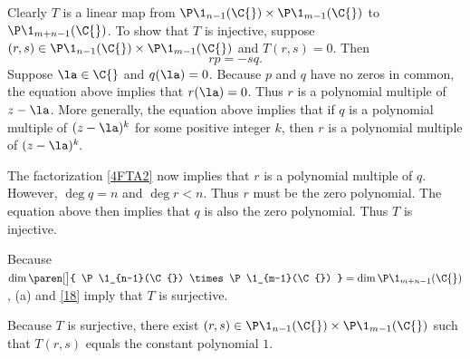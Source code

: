 \begin{Solution}
\begin{subtheorem}
\item
Clearly $T$ is a linear map from $\P\1_{n-1}(\C{}) \times \P\1_{m-1}(\C{})$ to ${\P\1_{m+n-1}(\C{})}$. To show that $T$ is injective, suppose
$(r, s) \in \P\1_{n-1}(\C{}) \times \P\1_{m-1}(\C{})$ and $T(r, s) = 0$. Then
\[
rp = -sq.
\]
Suppose $\la \in \C{}$ and $q(\la) = 0$. Because $p$ and $q$ have no zeros in common, the equation above implies that $r(\la) = 0$. Thus $r$ is a polynomial multiple of $z-\la$. More generally, the equation above implies that if $q$ is a polynomial multiple of $(z-\la)^k$ for some positive integer $k$, then $r$ is a polynomial multiple of $(z - \la)^k\!$.

The factorization \ref{4FTA2} now implies that $r$ is a polynomial multiple of $q$. However, $\deg q = n$ and
$\deg r < n$. Thus $r$ must be the zero polynomial. The equation above then implies that $q$ is also the zero polynomial. Thus $T$ is injective.

\item
Because $\dim \paren[\big]{ \P\1_{n-1}(\C{}) \times \P\1_{m-1}(\C{}) } = \dim \P\1_{m+n-1}(\C{})$, (a) and \ref{18} imply that $T$ is surjective.

\item
Because $T$ is surjective, there exist $(r, s) \in \P\1_{n-1}(\C{}) \times \P\1_{m-1}(\C{})$ such that $T(r, s)$ equals the constant polynomial $1$.
\end{subtheorem}
\end{Solution}

